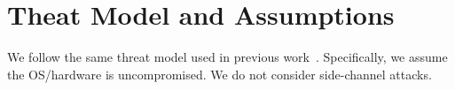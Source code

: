\section{Theat Model and Assumptions}
We follow the same threat model used in previous work~\cite{}. Specifically, we assume the OS/hardware is uncompromised. We do not consider side-channel attacks. 